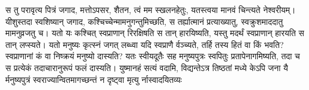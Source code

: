 \vakya स तु परावृत्य पित्रं जगाद, मत्तोऽपसर, शैतन, त्वं मम स्खलनहेतुः, यतस्त्वया मानवं चिन्त्यते नेश्वरीयम्।
\vakya यीशुस्तदा स्वशिष्यान् जगाद, कश्चिच्चेन्मामनुगन्तुमिच्छति, स तर्ह्यात्मानं प्रत्याख्यातु, स्वक्रुशमाददातु मामनुव्रजतु च।
\vakya यतो यः कश्चित् स्वप्राणान् रिरक्षिषति स तान् हारयिष्यति, यस्तु मदर्थं स्वप्राणान् हारयति स तान् लप्स्यते।
\vakya यतो मनुष्यः कृत्स्नं जगत् लब्ध्वा यदि स्वप्राणै र्वञ्च्यते, तर्हि तस्य हितं वा किं भवति?
\vakya स्वप्राणानां कं वा निष्क्रयं मनुष्यो दास्यति? यतः स्वीयदूतैः सह मनुष्यपुत्रः स्वपितुः प्रतापेनागमिष्यति, तदा च स प्रत्येकं तदाचारानुरूपं फलं दास्यति।
\vakya युष्मानहं सत्यं वदामि, विद्यन्तेऽत्र तिष्ठतां मध्ये केऽपि जना यै र्मनुष्यपुत्रं स्वराज्यान्वितमागच्छन्तं न दृष्ट्वा मृत्यु र्नास्वादयितव्यः\eoc